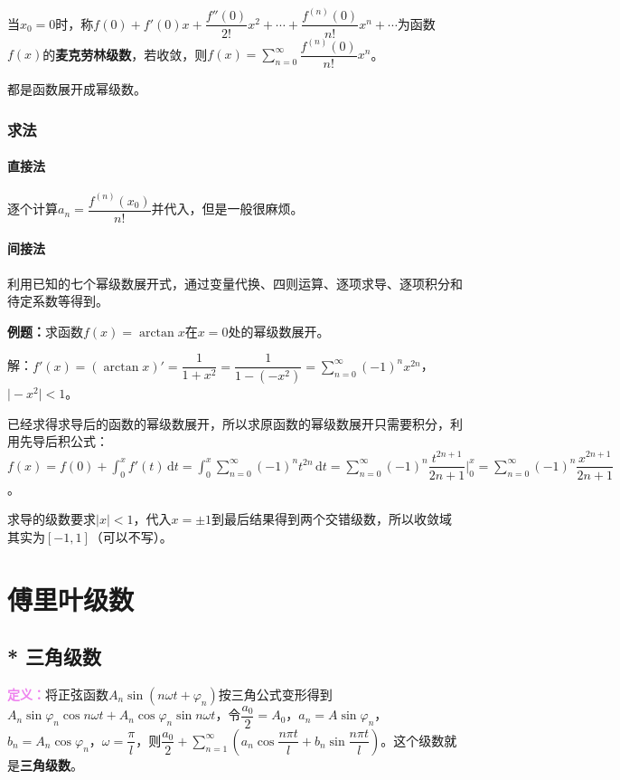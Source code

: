 \documentclass[UTF8, 12pt]{ctexart}
\begin{document}
当$x_0=0$时，称$f(0)+f'(0)x+\dfrac{f''(0)}{2!}x^2+\cdots+\dfrac{f^{(n)}(0)}{n!}x^n+\cdots$为函数$f(x)$的\textbf{麦克劳林级数}，若收敛，则$f(x)=\sum\limits_{n=0}^\infty\dfrac{f^{(n)}(0)}{n!}x^n$。

都是函数展开成幂级数。

\subsubsection{求法}

\paragraph{直接法} \leavevmode \medskip

逐个计算$a_n=\dfrac{f^{(n)}(x_0)}{n!}$并代入，但是一般很麻烦。

\paragraph{间接法} \leavevmode \medskip

利用已知的七个幂级数展开式，通过变量代换、四则运算、逐项求导、逐项积分和待定系数等得到。

\textbf{例题：}求函数$f(x)=\arctan x$在$x=0$处的幂级数展开。

解：$f'(x)=(\arctan x)'=\dfrac{1}{1+x^2}=\dfrac{1}{1-(-x^2)}=\sum\limits_{n=0}^\infty(-1)^nx^{2n}$，$\vert-x^2\vert<1$。

已经求得求导后的函数的幂级数展开，所以求原函数的幂级数展开只需要积分，利用先导后积公式：$f(x)=f(0)+\int_0^xf'(t)\,\textrm{d}t=\int_0^x\sum\limits_{n=0}^\infty(-1)^nt^{2n}\,\textrm{d}t=\sum\limits_{n=0}^\infty(-1)^n\dfrac{t^{2n+1}}{2n+1}\bigg|_0^x=\sum\limits_{n=0}^\infty(-1)^n\dfrac{x^{2n+1}}{2n+1}$。

求导的级数要求$\vert x\vert<1$，代入$x=\pm1$到最后结果得到两个交错级数，所以收敛域其实为$[-1,1]$（可以不写）。

\section{傅里叶级数}

\subsection{* 三角级数}

\textcolor{violet}{\textbf{定义：}}将正弦函数$A_n\sin(n\omega t+\varphi_n)$按三角公式变形得到$A_n\sin\varphi_n\cos n\omega t+A_n\cos\varphi_n\sin n\omega t$，令$\dfrac{a_0}{2}=A_0$，$a_n=A\sin\varphi_n$，$b_n=A_n\cos\varphi_n$，$\omega=\dfrac{\pi}{l}$，则$\dfrac{a_0}{2}+\sum\limits_{n=1}^\infty\left(a_n\cos\dfrac{n\pi t}{l}+b_n\sin\dfrac{n\pi t}{l}\right)$。这个级数就是\textbf{三角级数}。
\end{document}
